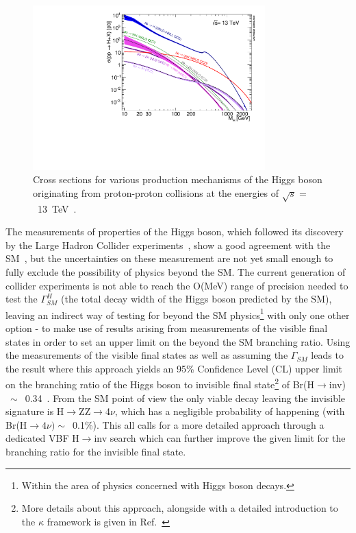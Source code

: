 \begin{figure}[htbp]
    \begin{center}
        \includegraphics[width=0.8\textwidth]{Theory/higgs_prod_13TeV.pdf}  
        \caption{Cross sections for various production mechanisms of the Higgs boson originating from proton-proton collisions at the energies of $\sqrt{s}=$~13~TeV~\cite{twiki:lhcxswg}.}
      \label{fig:hig_production_xs}
    \end{center}
  \end{figure}

\hspace{10pt} The measurements of properties of the Higgs boson, which followed its discovery by the Large Hadron Collider experiments~\cite{paper:higgs_discovery1,paper:higgs_discovery2}, show a good agreement with the SM~\cite{paper:higgs_prop1,paper:higgs_prop2,paper:higgs_prop3}, but the uncertainties on these measurement are not yet small enough to fully exclude the possibility of physics beyond the SM. The current generation of collider experiments is not able to reach the O(MeV) range of precision needed to test the $\Gamma_{SM}^H$ (the total decay width of the Higgs boson predicted by the SM), leaving an indirect way of testing for beyond the SM physics\footnote{Within the area of physics concerned with Higgs boson decays.} with only one other option - to make use of results arising from measurements of the visible final states in order to set an upper limit on the beyond the SM branching ratio. Using the measurements of the visible final states as well as assuming the $\Gamma_{SM}$ leads to the result where this approach yields an 95\% Confidence Level (CL) upper limit on the branching ratio of the Higgs boson to invisible final state\footnote{More details about this approach, alongside with a detailed introduction to the $\kappa$ framework is given in Ref.~\cite{report_lhcxswg_3}} of Br(H$\rightarrow$inv)$~\sim$~0.34~\cite{paper:higgs_prop1}. From the SM point of view the only viable decay leaving the invisible signature is H$\rightarrow$ZZ$\rightarrow$4$\nu$, which has a negligible probability of happening (with Br(H$\rightarrow 4\nu )\sim$~0.1\%). This all calls for a more detailed approach through a dedicated VBF H$\rightarrow$inv search which can further improve the given limit for the branching ratio for the invisible final state.

